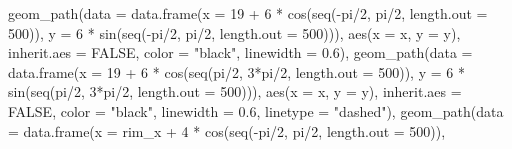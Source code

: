 \documentclass[
  9pt,
  ignorenonframetext,
  aspectratio=169]{beamer}
\newenvironment{Shaded}{\begin{snugshade}}{\end{snugshade}}
\newcommand{\AttributeTok}[1]{\textcolor[rgb]{0.00,0.34,0.68}{#1}}
\newcommand{\ConstantTok}[1]{\textcolor[rgb]{0.67,0.33,0.00}{#1}}
\newcommand{\DecValTok}[1]{\textcolor[rgb]{0.69,0.50,0.00}{#1}}
\newcommand{\FloatTok}[1]{\textcolor[rgb]{0.69,0.50,0.00}{#1}}
\newcommand{\FunctionTok}[1]{\textcolor[rgb]{0.39,0.29,0.61}{#1}}
\newcommand{\NormalTok}[1]{\textcolor[rgb]{0.12,0.11,0.11}{#1}}
\newcommand{\SpecialCharTok}[1]{\textcolor[rgb]{0.24,0.68,0.91}{#1}}
\newcommand{\StringTok}[1]{\textcolor[rgb]{0.75,0.01,0.01}{#1}}
\begin{document}
\begin{frame}[fragile]{}
\begin{Shaded}
\begin{Highlighting}[]
    \FunctionTok{geom\_path}\NormalTok{(}\AttributeTok{data =} \FunctionTok{data.frame}\NormalTok{(}\AttributeTok{x =} \DecValTok{19} \SpecialCharTok{+} \DecValTok{6} \SpecialCharTok{*} \FunctionTok{cos}\NormalTok{(}\FunctionTok{seq}\NormalTok{(}\SpecialCharTok{{-}}\NormalTok{pi}\SpecialCharTok{/}\DecValTok{2}\NormalTok{, pi}\SpecialCharTok{/}\DecValTok{2}\NormalTok{, }\AttributeTok{length.out =} \DecValTok{500}\NormalTok{)),}
                                \AttributeTok{y =} \DecValTok{6} \SpecialCharTok{*} \FunctionTok{sin}\NormalTok{(}\FunctionTok{seq}\NormalTok{(}\SpecialCharTok{{-}}\NormalTok{pi}\SpecialCharTok{/}\DecValTok{2}\NormalTok{, pi}\SpecialCharTok{/}\DecValTok{2}\NormalTok{, }\AttributeTok{length.out =} \DecValTok{500}\NormalTok{))),}
              \FunctionTok{aes}\NormalTok{(}\AttributeTok{x =}\NormalTok{ x, }\AttributeTok{y =}\NormalTok{ y), }\AttributeTok{inherit.aes =} \ConstantTok{FALSE}\NormalTok{, }\AttributeTok{color =} \StringTok{"black"}\NormalTok{, }\AttributeTok{linewidth =} \FloatTok{0.6}\NormalTok{),}
    \FunctionTok{geom\_path}\NormalTok{(}\AttributeTok{data =} \FunctionTok{data.frame}\NormalTok{(}\AttributeTok{x =} \DecValTok{19} \SpecialCharTok{+} \DecValTok{6} \SpecialCharTok{*} \FunctionTok{cos}\NormalTok{(}\FunctionTok{seq}\NormalTok{(pi}\SpecialCharTok{/}\DecValTok{2}\NormalTok{, }\DecValTok{3}\SpecialCharTok{*}\NormalTok{pi}\SpecialCharTok{/}\DecValTok{2}\NormalTok{, }\AttributeTok{length.out =} \DecValTok{500}\NormalTok{)),}
                                \AttributeTok{y =} \DecValTok{6} \SpecialCharTok{*} \FunctionTok{sin}\NormalTok{(}\FunctionTok{seq}\NormalTok{(pi}\SpecialCharTok{/}\DecValTok{2}\NormalTok{, }\DecValTok{3}\SpecialCharTok{*}\NormalTok{pi}\SpecialCharTok{/}\DecValTok{2}\NormalTok{, }\AttributeTok{length.out =} \DecValTok{500}\NormalTok{))),}
              \FunctionTok{aes}\NormalTok{(}\AttributeTok{x =}\NormalTok{ x, }\AttributeTok{y =}\NormalTok{ y), }\AttributeTok{inherit.aes =} \ConstantTok{FALSE}\NormalTok{, }\AttributeTok{color =} \StringTok{"black"}\NormalTok{, }\AttributeTok{linewidth =} \FloatTok{0.6}\NormalTok{,}
              \AttributeTok{linetype =} \StringTok{"dashed"}\NormalTok{),}
    \FunctionTok{geom\_path}\NormalTok{(}\AttributeTok{data =} \FunctionTok{data.frame}\NormalTok{(}\AttributeTok{x =}\NormalTok{ rim\_x }\SpecialCharTok{+} \DecValTok{4} \SpecialCharTok{*} \FunctionTok{cos}\NormalTok{(}\FunctionTok{seq}\NormalTok{(}\SpecialCharTok{{-}}\NormalTok{pi}\SpecialCharTok{/}\DecValTok{2}\NormalTok{, pi}\SpecialCharTok{/}\DecValTok{2}\NormalTok{, }\AttributeTok{length.out =} \DecValTok{500}\NormalTok{)),}

\end{Highlighting}
\end{Shaded}
\end{frame}
\end{document}

